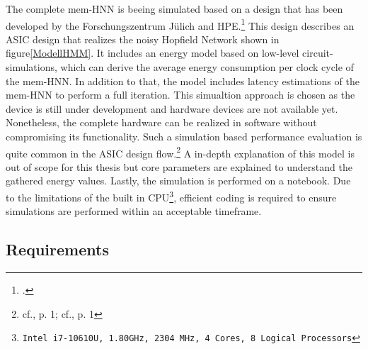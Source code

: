 The complete \ac{mem-HNN} is beeing simulated based on a design that has been developed by the Forschungszentrum Jülich and HPE.\footcite[cf.][3-4]{hizzaniMemristorbasedHardwareAlgorithms2023}  
This design describes an \ac{ASIC} design that realizes the noisy Hopfield Network shown in figure\ref{ModellHMM}.
It includes an energy model based on low-level circuit-simulations, which can derive the average energy consumption per clock cycle of the \ac{mem-HNN}.
In addition to that, the model includes latency estimations of the \ac{mem-HNN} to perform a full iteration. 
This simualtion approach is chosen as the device is still under development and hardware devices are not available yet.
Nonetheless, the complete hardware can be realized in software without compromising its functionality.
Such a simulation based performance evaluation is quite common in the \ac{ASIC} design flow.\footnote{cf.\cite{raoUltimateGuideASIC}, p. 1; cf.\cite{ASICDesignFlow}, p. 1}
A in-depth explanation of this model is out of scope for this thesis but core parameters are explained to understand the gathered energy values.
Lastly, the simulation is performed on a notebook.
Due to the limitations of the built in \ac{CPU}\footnote{\texttt{Intel i7-10610U, 1.80GHz, 2304 MHz, 4 Cores, 8 Logical Processors}}, efficient coding is required to ensure simulations are performed within an acceptable timeframe.

\subsection{Requirements}

